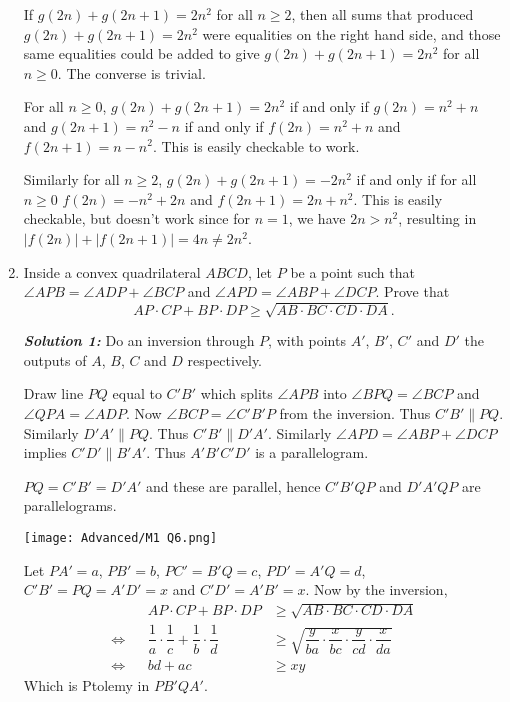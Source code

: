 \documentclass[12pt]{article}
\newcommand{\solnum}[1]{\textbf{\textit{Solution #1: }}}
\begin{document}
\begin{enumerate}[topsep=\bigskipamount,itemsep=\bigskipamount,leftmargin=0pt]
If $g(2n)+g(2n+1)=2n^2$ for all $n\geq 2$,
then
all sums that produced $g(2n)+g(2n+1)=2n^2$
were equalities on the right hand side,
and those same equalities could be added to give
$g(2n)+g(2n+1)=2n^2$ for all $n\geq 0$.
The converse is trivial.

For all $n\geq 0$, 
$g(2n)+g(2n+1)=2n^2$ 
if and only if 
$g(2n) = n^2+n$ and $g(2n+1) = n^2-n$
if and only if
$f(2n) = n^2+n$ and $f(2n+1) = n-n^2$.
This is easily checkable to work.

Similarly for all $n\geq 2$, 
$g(2n)+g(2n+1)=-2n^2$ 
if and only if 
for all $n\geq 0$
$f(2n) = -n^2+2n$ and $f(2n+1) = 2n+n^2$.
This is easily checkable, but doesn't work since for $n=1$, we have $2n > n^2$, resulting in $|f(2n)| + |f(2n+1)| = 4n \neq 2n^2$.


\item %
Inside a convex quadrilateral $ABCD$, let $P$ be a point such that $\angle APB=\angle ADP+\angle BCP$ and $\angle APD=\angle ABP+\angle DCP$.
Prove that $$AP\cdot CP+BP\cdot DP \geqslant \sqrt{AB\cdot BC\cdot CD\cdot DA}.$$

\solnum{1}
Do an inversion through $P$,
with points $A'$, $B'$, $C'$ and $D'$
the outputs of $A$, $B$, $C$ and $D$ respectively.

Draw line $PQ$ equal to $C'B'$
which splits $\angle APB$ 
into $\angle BPQ = \angle BCP$ 
and $\angle QPA = \angle ADP$.
Now $\angle BCP = \angle C'B'P$ from the inversion.
Thus $C'B'\parallel PQ$.
Similarly $D'A'\parallel PQ$.
Thus $C'B' \parallel D'A'$.
Similarly $\angle APD=\angle ABP+\angle DCP$
implies $C'D'\parallel B'A'$.
Thus $A'B'C'D'$ is a parallelogram.

$PQ = C'B' = D'A'$ and these are parallel,
hence $C'B'QP$ and $D'A'QP$ are parallelograms.

\begin{center}
    \texttt{[image: Advanced/M1 Q6.png]}
\end{center}

Let $PA'=a$, $PB'=b$, $PC'=B'Q=c$, $PD'=A'Q=d$,
$C'B'=PQ=A'D'=x$ and $C'D' = A'B'=x$.
Now by the inversion,
\begin{align*}
    && AP\cdot CP+BP\cdot DP & \geqslant \sqrt{AB\cdot BC\cdot CD\cdot DA}\\
    \iff && \dfrac{1}{a}\cdot \dfrac{1}{c}+\dfrac{1}{b}\cdot \dfrac{1}{d} & \geqslant \sqrt{\dfrac{y}{ba}\cdot \dfrac{x}{bc}\cdot \dfrac{y}{cd}\cdot \dfrac{x}{da}}\\
    \iff && bd+ac & \geqslant xy
\end{align*}
Which is Ptolemy in $PB'QA'$.


\end{enumerate}
\end{document}
